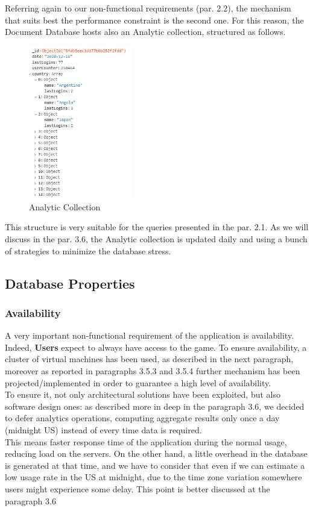 Referring again to our non-functional requirements (par. 2.2), the mechanism that suits best the performance constraint is the second one. 
For this reason, the Document Database hosts also an Analytic collection, structured as follows.
\begin{figure}[H]
	\centering
	\includegraphics[width= 0.4\textwidth]{img/analytic_collection.png}
	\caption{Analytic Collection}
\end{figure}

This structure is very suitable for the queries presented in the par. 2.1. 
As we will discuss in the par. 3.6, the Analytic collection is updated daily and using a bunch of strategies to minimize the database stress.


\subsection{Database Properties}
\subsubsection{Availability}
A very important non-functional requirement of the application is availability.\\ 
Indeed, \textbf{Users} expect to always have access to the game.
To ensure availability, a cluster of virtual machines has been used, as described in the next paragraph, moreover as reported in paragraphs 3.5.3 and 3.5.4 further mechanism has been projected/implemented in order to guarantee a high level of availability.\\
To ensure it, not only architectural solutions have been exploited, but also software design ones: as described more in deep in the paragraph 3.6, we decided to defer analytics operations, computing aggregate results only once a day (midnight US) instead of every time data is required.\\
This means faster response time of the application during the normal usage, reducing load on the servers. On the other hand, a little overhead in the database is generated at that time, and we have to consider that even if we can estimate a low usage rate in the US at midnight, due to the time zone variation somewhere users might experience some delay. This point is better discussed at the paragraph 3.6     
